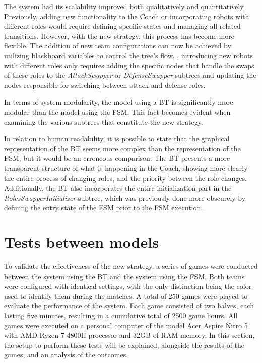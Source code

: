 The system had its scalability improved both qualitatively and quantitatively. Previously, adding new functionality to the Coach or incorporating robots with different roles would require defining specific states and managing all related transitions. However, with the new strategy, this process has become more flexible. The addition of new team configurations can now be achieved by utilizing blackboard variables to control the tree's flow. , introducing new robots with different roles only requires adding the specific nodes that handle the swaps of these roles to the \textit{AttackSwapper} or \textit{DefenseSwapper} subtrees and updating the nodes responsible for switching between attack and defense roles.

In terms of system modularity, the model using a BT is significantly more modular than the model using the FSM. This fact becomes evident when examining the various subtrees that constitute the new strategy.

In relation to human readability, it is possible to state that the graphical representation of the BT seems more complex than the representation of the FSM, but it would be an erroneous comparison. The BT presents a more transparent structure of what is happening in the Coach, showing more clearly the entire process of changing roles, and the priority between the role changes. Additionally, the BT also incorporates the entire initialization part in the \textit{RolesSwapperInitializer} subtree, which was previously done more obscurely by defining the entry state of the FSM prior to the FSM execution.

\section{Tests between models}

To validate the effectiveness of the new strategy, a series of games were conducted between the system using the BT and the system using the FSM. Both teams were configured with identical settings, with the only distinction being the color used to identify them during the matches. A total of 250 games were played to evaluate the performance of the system. Each game consisted of two halves, each lasting five minutes, resulting in a cumulative total of 2500 game hours. All games were executed on a personal computer of the model Acer Aspire Nitro 5 with AMD Ryzen 7 4800H processor and 32GB of RAM memory. In this section, the setup to perform these tests will be explained, alongside the results of the games, and an analysis of the outcomes.

